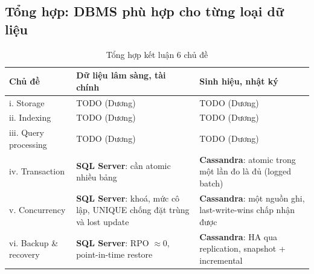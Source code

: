 \subsection{Tổng hợp: DBMS phù hợp cho từng loại dữ liệu}
\label{sec:summary}

\begin{table}[H]
\centering
\caption{Tổng hợp kết luận 6 chủ đề}
\label{tab:summary}
\begin{tabularx}{\linewidth}{|p{2.8cm}|X|X|}
\hline
\textbf{Chủ đề} & \textbf{Dữ liệu lâm sàng, tài chính} & \textbf{Sinh hiệu, nhật ký} \\ \hline
i. Storage & \colorbox{yellow!40}{TODO (Dương)} & \colorbox{yellow!40}{TODO (Dương)} \\ \hline
ii. Indexing & \colorbox{yellow!40}{TODO (Dương)} & \colorbox{yellow!40}{TODO (Dương)} \\ \hline
iii. Query processing & \colorbox{yellow!40}{TODO (Dương)} & \colorbox{yellow!40}{TODO (Dương)} \\ \hline
iv. Transaction & \textbf{SQL Server}: cần atomic nhiều bảng & \textbf{Cassandra}: atomic trong một lần đo là đủ (logged batch) \\ \hline
v. Concurrency & \textbf{SQL Server}: khoá, mức cô lập, UNIQUE chống đặt trùng và lost update & \textbf{Cassandra}: một nguồn ghi, last-write-wins chấp nhận được \\ \hline
vi. Backup \& recovery & \textbf{SQL Server}: RPO $\approx 0$, point-in-time restore & \textbf{Cassandra}: HA qua replication, snapshot + incremental \\ \hline
\end{tabularx}
\end{table}
